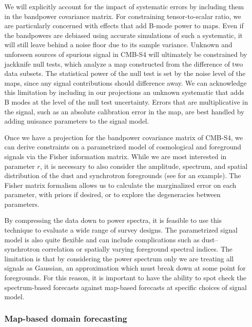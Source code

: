 We will explicitly account for the impact of systematic errors by including them in the bandpower covariance matrix.
For constraining tensor-to-scalar ratio, we are particularly concerned with effects that add B-mode power to maps.
Even if the bandpowers are debiased using accurate simulations of such a systematic, it will still leave behind a noise floor due to its sample variance.
Unknown and unforseen sources of spurious signal in CMB-S4 will ultimately be constrained by jackknife null tests, which analyze a map constructed from the difference of two data subsets.
The statistical power of the null test is set by the noise level of the maps, since any signal contributions should difference away.
We can acknowledge this limitation by including in our projections an unknown systematic that adds B modes at the level of the null test uncertainty.
Errors that are multiplicative in the signal, such as an absolute calibration error in the map, are best handled by adding nuisance parameters to the signal model.

Once we have a projection for the bandpower covariance matrix of CMB-S4, we can derive constraints on a parametrized model of cosmological and foreground signals via the Fisher information matrix.
While we are most interested in parameter $r$, it is necessary to also consider the amplitude, spectrum, and spatial distribution of the dust and synchrotron foregrounds (see \cite{bicepkeckplanck15} for an example).
The Fisher matrix formalism allows us to calculate the marginalized error on each parameter, with priors if desired, or to explore the degeneracies between parameters.

By compressing the data down to power spectra, it is feasible to use this technique to evaluate a wide range of survey designs.
The parametrized signal model is also quite flexible and can include complications such as dust--synchrotron correlation or spatially varying foreground spectral indices.
The limitation is that by considering the power spectrum only we are treating all signals as Gaussian, an approximation which must break down at some point for foregrounds.
For this reason, it is important to have the ability to spot check the spectrum-based forecasts against map-based forecasts at specific choices of signal model.

\subsubsection{Map-based domain forecasting}

